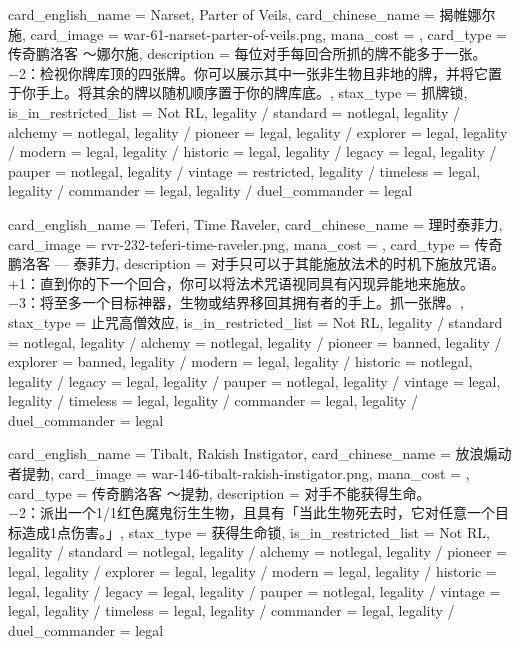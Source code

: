 \documentclass[lang = cn, color = black, 10pt]{AllThatStax}
\begin{document}
\card
{
	card_english_name = {Narset, Parter of Veils},
	card_chinese_name = {揭帷娜尔施},
	card_image = war-61-narset-parter-of-veils.png,
	mana_cost = ,
	card_type = 传奇鹏洛客 ～娜尔施,
	description = {每位对手每回合所抓的牌不能多于一张。\\
		−2：检视你牌库顶的四张牌。你可以展示其中一张非生物且非地的牌，并将它置于你手上。将其余的牌以随机顺序置于你的牌库底。},
	stax_type = 抓牌锁,
	is_in_restricted_list = Not RL,
	legality / standard = notlegal,
	legality / alchemy = notlegal,
	legality / pioneer = legal,
	legality / explorer = legal,
	legality / modern = legal,
	legality / historic = legal,
	legality / legacy = legal,
	legality / pauper = notlegal,
	legality / vintage = restricted,
	legality / timeless = legal,
	legality / commander = legal,
	legality / duel_commander = legal
}

\card
{
	card_english_name = {Teferi, Time Raveler},
	card_chinese_name = {理时泰菲力},
	card_image = rvr-232-teferi-time-raveler.png,
	mana_cost = ,
	card_type = 传奇鹏洛客 — 泰菲力,
	description = {对手只可以于其能施放法术的时机下施放咒语。\\
		+1：直到你的下一个回合，你可以将法术咒语视同具有闪现异能地来施放。\\
		−3：将至多一个目标神器，生物或结界移回其拥有者的手上。抓一张牌。},
	stax_type = 止咒高僧效应,
	is_in_restricted_list = Not RL,
	legality / standard = notlegal,
	legality / alchemy = notlegal,
	legality / pioneer = banned,
	legality / explorer = banned,
	legality / modern = legal,
	legality / historic = notlegal,
	legality / legacy = legal,
	legality / pauper = notlegal,
	legality / vintage = legal,
	legality / timeless = legal,
	legality / commander = legal,
	legality / duel_commander = legal
}

\card
{
	card_english_name = {Tibalt, Rakish Instigator},
	card_chinese_name = {放浪煽动者提勃},
	card_image = war-146-tibalt-rakish-instigator.png,
	mana_cost = ,
	card_type = 传奇鹏洛客 ～提勃,
	description = {对手不能获得生命。\\
		−2：派出一个1/1红色魔鬼衍生生物，且具有「当此生物死去时，它对任意一个目标造成1点伤害。」},
	stax_type = 获得生命锁,
	is_in_restricted_list = Not RL,
	legality / standard = notlegal,
	legality / alchemy = notlegal,
	legality / pioneer = legal,
	legality / explorer = legal,
	legality / modern = legal,
	legality / historic = legal,
	legality / legacy = legal,
	legality / pauper = notlegal,
	legality / vintage = legal,
	legality / timeless = legal,
	legality / commander = legal,
	legality / duel_commander = legal
}
\end{document}
